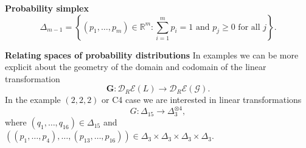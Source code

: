 \begin{frame}
\begin{block}{\textbf{Probability simplex}}
$$
\Delta_{m-1} = \left\{ (p_1, \ldots , p_m) \in \mathbb{R}^m \colon \sum_{i=1}^m p_i = 1 \text{ and } p_j \geq 0 \text{ for all } j \right\}.
$$
\end{block}
\begin{block}{\textbf{Relating spaces of probability distributions}}
In examples we can be more explicit about the geometry of the domain and codomain of the linear transformation
$$\mathbf{G} \colon \mathcal{D}_R\mathcal{E}(L) \rightarrow \mathcal{D}_R\mathcal{E}(\mathcal{G}).$$
In the example $(2,2,2)$ or C4 case we are interested in linear transformations
$$
G \colon \Delta_{15} \longrightarrow \Delta_3^{\otimes 4},
$$
where $(q_1, \ldots, q_{16}) \in \Delta_{15}$ and $((p_1, \ldots , p_4), \ldots, (p_{13},\ldots,p_{16})) \in \Delta_3 \times \Delta_3 \times \Delta_3 \times \Delta_3$.
\end{block}
\end{frame}
